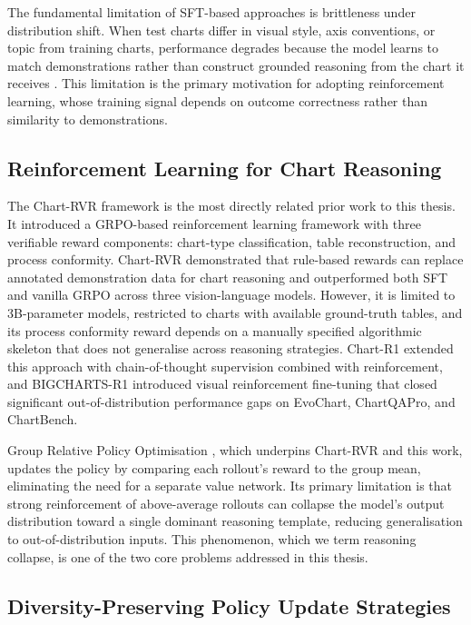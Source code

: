 \documentclass{iutbscthesis}
\begin{document}
The fundamental limitation of SFT-based approaches is brittleness under
distribution shift. When test charts differ in visual style, axis conventions, or
topic from training charts, performance degrades because the model learns to
match demonstrations rather than construct grounded reasoning from the chart
it receives \cite{onoe2024chartrvr}. This limitation is the primary motivation for
adopting reinforcement learning, whose training signal depends on outcome
correctness rather than similarity to demonstrations.

\subsection{Reinforcement Learning for Chart Reasoning}

The Chart-RVR framework \cite{onoe2024chartrvr} is the most directly related prior
work to this thesis. It introduced a GRPO-based reinforcement learning framework
with three verifiable reward components: chart-type classification, table
reconstruction, and process conformity. Chart-RVR demonstrated that rule-based
rewards can replace annotated demonstration data for chart reasoning and
outperformed both SFT and vanilla GRPO across three vision-language models.
However, it is limited to 3B-parameter models, restricted to charts with available
ground-truth tables, and its process conformity reward depends on a manually
specified algorithmic skeleton that does not generalise across reasoning strategies.
Chart-R1 \cite{chart_r1} extended this approach with chain-of-thought supervision
combined with reinforcement, and BIGCHARTS-R1 \cite{bigcharts} introduced visual
reinforcement fine-tuning that closed significant out-of-distribution performance
gaps on EvoChart, ChartQAPro, and ChartBench.

Group Relative Policy Optimisation \cite{shao2024deepseekmath}, which underpins
Chart-RVR and this work, updates the policy by comparing each rollout's reward
to the group mean, eliminating the need for a separate value network. Its primary
limitation is that strong reinforcement of above-average rollouts can collapse the
model's output distribution toward a single dominant reasoning template, reducing
generalisation to out-of-distribution inputs. This phenomenon, which we term
reasoning collapse, is one of the two core problems addressed in this thesis.

\subsection{Diversity-Preserving Policy Update Strategies}
\end{document}
